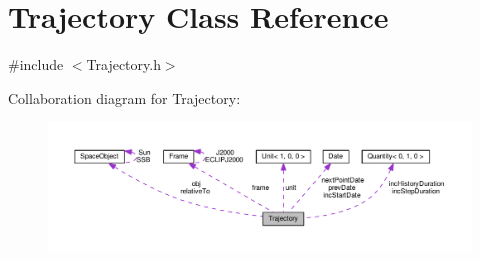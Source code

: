 \hypertarget{class_trajectory}{\section{Trajectory Class Reference}
\label{class_trajectory}
}


{\ttfamily \#include $<$Trajectory.\+h$>$}



Collaboration diagram for Trajectory\+:\nopagebreak
\begin{figure}[H]
\begin{center}
\leavevmode
\includegraphics[width=350pt]{class_trajectory__coll__graph}
\end{center}
\end{figure}
